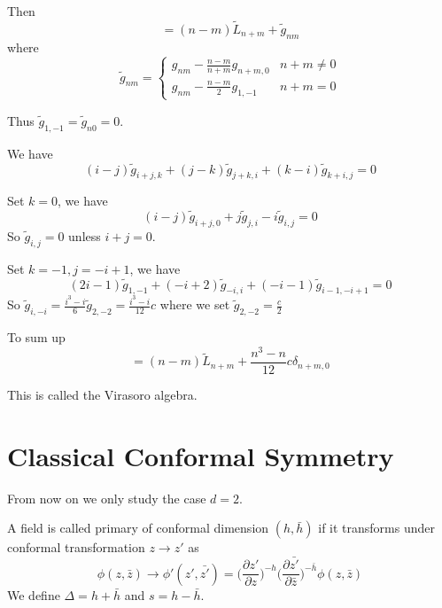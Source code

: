 \documentclass[12pt]{book}
\begin{document}
	Then
	\begin{equation}
		[\tilde L_n,\tilde L_m]=(n-m)\tilde L_{n+m}+\tilde g_{nm}
	\end{equation}
	where
	\begin{equation}
		\tilde g_{nm}=\left\{\begin{array}{ll}
			g_{nm}-\frac{n-m}{n+m}g_{n+m,0} & n+m\neq0\\
			g_{nm}-\frac {n-m}2g_{1,-1} & n+m=0
		\end{array} \right.
	\end{equation}
	
	Thus $\tilde g_{1,-1}=\tilde g_{n0}=0$.
	
	We have
	\begin{equation}
		(i-j)\tilde g_{i+j,k}+(j-k)\tilde g_{j+k,i}+(k-i)\tilde g_{k+i,j}=0
	\end{equation}
	
	Set $k=0$, we have
	\begin{equation}
		(i-j)\tilde g_{i+j,0}+j\tilde g_{j,i}-i\tilde g_{i,j}=0
	\end{equation}
	So $\tilde g_{i,j}=0$ unless $i+j=0$.
	
	Set $k=-1,j=-i+1$, we have
	\begin{equation}
		(2i-1)\tilde g_{1,-1}+(-i+2)\tilde g_{-i,i}+(-i-1)\tilde g_{i-1,-i+1}=0
	\end{equation}
	So $\tilde g_{i,-i}=\frac{i^3-i}6\tilde g_{2,-2}=\frac{i^3-i}{12}c$ where we set $\tilde g_{2,-2}=\frac c2$
	
	To sum up
	\begin{equation}
		[\tilde L_n,\tilde L_m]=(n-m)\tilde L_{n+m}+\frac{n^3-n}{12}c\delta_{n+m,0}
	\end{equation}
	
	This is called the Virasoro algebra.
	
	\section{Classical Conformal Symmetry}
	
	From now on we only study the case $d=2$.
	
	A field is called primary of conformal dimension $(h,\bar h)$ if it transforms under conformal transformation $z\rightarrow z'$ as
	\begin{equation}
		\phi(z,\bar z)\rightarrow \phi'(z',\bar{z'})=\bigg(\frac {\partial z'}{\partial z}\bigg)^{-h}\bigg(\frac {\partial \bar{z'}}{\partial \bar z}\bigg)^{-\bar h}\phi(z,\bar z)
	\end{equation}
	We define $\Delta=h+\bar h$ and $s=h-\bar h$.
	
\end{document}
